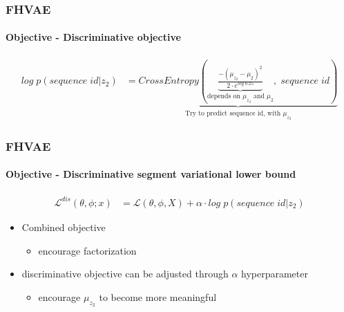 \documentclass[9pt]{beamer}
\begin{document}
\begin{frame}
\frametitle{FHVAE}
\framesubtitle{Objective - Discriminative objective}
\begin{align*}
log\;p(sequence\;id | z_2)& = \underbrace{CrossEntropy(\underbrace{\frac{-(\mu_{z_2} - \mu_2)^2}{2 \cdot e^{log\;0.25}}}_{\text{depends on $\mu_{z_2}$ and $\mu_2$}},\;sequence\;id)}_{\text{Try to predict sequence id, with $\mu_{z_2}$}}
\end{align*}
\end{frame} 



\begin{frame}
\frametitle{FHVAE}
\framesubtitle{Objective - Discriminative segment variational lower bound}
\begin{align*}
\mathcal{L}^{dis}(\theta, \phi;x)& = \mathcal{L}(\theta, \phi, X) + \alpha \cdot log\;p(sequence\;id | z_2)
\end{align*}
\begin{itemize}
	\item Combined objective
	\begin{itemize}
		\item encourage factorization
	\end{itemize}
	\item discriminative objective can be adjusted through $\alpha$ hyperparameter
	\begin{itemize}
		\item encourage $\mu_{z_2}$ to become more meaningful
	\end{itemize}
\end{itemize}
\end{frame} 

\end{document}
